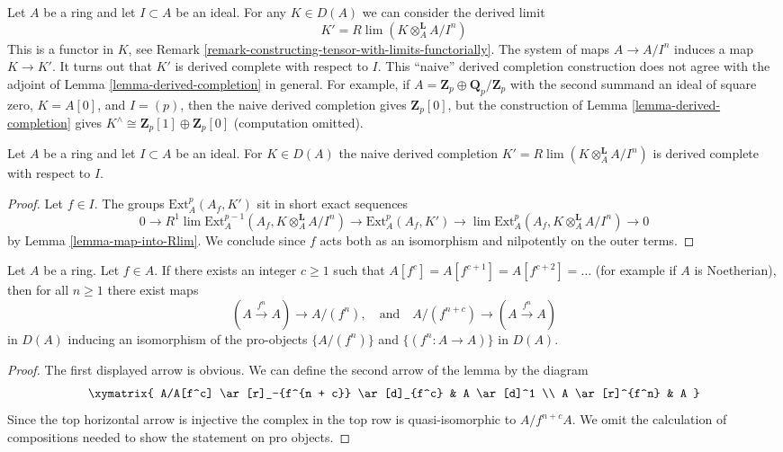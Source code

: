 \noindent
Let $A$ be a ring and let $I \subset A$ be an ideal. For any
$K \in D(A)$ we can consider the derived limit
$$
K' = R\lim (K \otimes_A^\mathbf{L} A/I^n)
$$
This is a functor in $K$, see
Remark \ref{remark-constructing-tensor-with-limits-functorially}.
The system of maps $A \to A/I^n$ induces a map $K \to K'$.
It turns out that $K'$ is derived complete with respect to $I$.
This ``naive'' derived completion construction does not agree
with the adjoint of Lemma \ref{lemma-derived-completion} in general.
For example, if $A = \mathbf{Z}_p \oplus \mathbf{Q}_p/\mathbf{Z}_p$
with the second summand an ideal of square zero, $K = A[0]$, and $I = (p)$,
then the naive derived completion gives $\mathbf{Z}_p[0]$, but the
construction of Lemma \ref{lemma-derived-completion} gives
$K^\wedge \cong \mathbf{Z}_p[1] \oplus \mathbf{Z}_p[0]$ (computation omitted).

\begin{lemma}
\label{lemma-naive-derived-completion}
Let $A$ be a ring and let $I \subset A$ be an ideal. For
$K \in D(A)$ the naive derived completion
$K' = R\lim (K \otimes_A^\mathbf{L} A/I^n)$
is derived complete with respect to $I$.
\end{lemma}

\begin{proof}
Let $f \in I$. The groups $\text{Ext}^p_A(A_f, K')$
sit in short exact sequences
$$
0 \to R^1\lim \text{Ext}^{p - 1}_A(A_f, K \otimes_A^\mathbf{L} A/I^n) \to
\text{Ext}^p_A(A_f, K') \to
\lim \text{Ext}^p_A(A_f, K \otimes_A^\mathbf{L} A/I^n) \to 0
$$
by Lemma \ref{lemma-map-into-Rlim}. We conclude since $f$ acts both
as an isomorphism and nilpotently on the outer terms.
\end{proof}

\begin{lemma}
\label{lemma-lift-universally}
Let $A$ be a ring. Let $f \in A$. If there exists an integer $c \geq 1$
such that $A[f^c] = A[f^{c + 1}] = A[f^{c + 2}] = \ldots$ (for example
if $A$ is Noetherian), then for all $n \geq 1$ there exist maps
$$
(A \xrightarrow{f^n} A) \longrightarrow A/(f^n),
\quad\text{and}\quad
A/(f^{n + c}) \longrightarrow (A \xrightarrow{f^n} A)
$$
in $D(A)$ inducing an isomorphism of the pro-objects $\{A/(f^n)\}$ and
$\{(f^n : A \to A)\}$ in $D(A)$.
\end{lemma}

\begin{proof}
The first displayed arrow is obvious. We can define the second arrow of
the lemma by the diagram
$$
\xymatrix{
A/A[f^c] \ar[r]_-{f^{n + c}} \ar[d]_{f^c} & A \ar[d]^1 \\
A \ar[r]^{f^n} & A
}
$$
Since the top horizontal arrow is injective the complex
in the top row is quasi-isomorphic to $A/f^{n + c}A$.
We omit the calculation of compositions needed to show
the statement on pro objects.
\end{proof}

